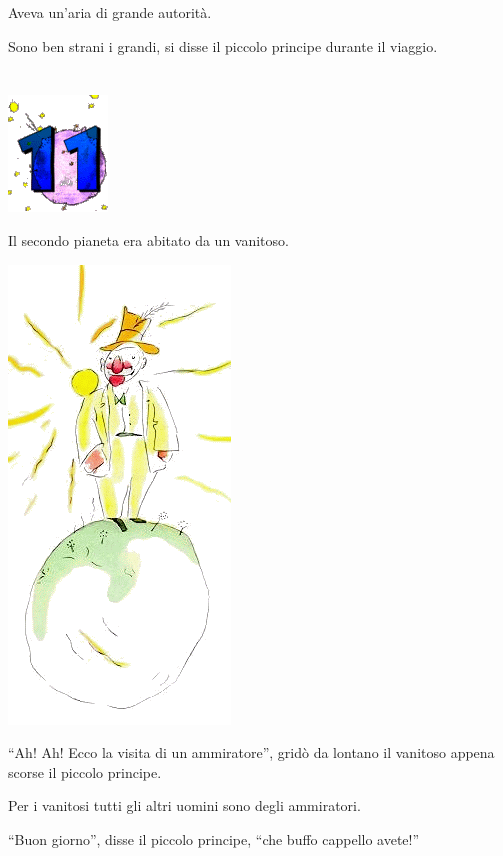 \documentclass[11pt]{scrbook}
\begin{document}
Aveva un'aria di grande autorità.

Sono ben strani i grandi, si disse il piccolo principe durante il viaggio.

\chapter{}
\begin{center}
\includegraphics{img/chapter11}
\end{center}

Il secondo pianeta era abitato da un vanitoso.

\begin{center}
\includegraphics{img/11a}
\end{center}

``Ah! Ah! Ecco la visita di un ammiratore'', gridò da lontano il vanitoso appena scorse il piccolo principe.

Per i vanitosi tutti gli altri uomini sono degli ammiratori.

``Buon giorno'', disse il piccolo principe, ``che buffo cappello avete!''
\end{document}
